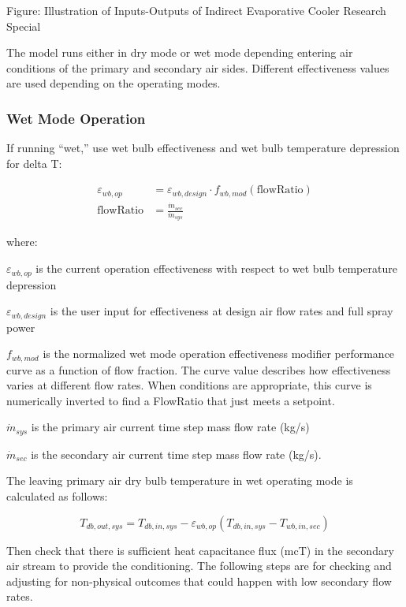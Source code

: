 Figure: Illustration of Inputs-Outputs of Indirect Evaporative Cooler Research Special

The model runs either in dry mode or wet mode depending entering air conditions of the primary and secondary air sides. Different effectiveness values are used depending on the operating modes.

\subsubsection{Wet Mode Operation}\label{wet-mode-operation}

If running ``wet,'' use wet bulb effectiveness and wet bulb temperature depression for delta T:

\begin{equation}
\begin{array}{rl}
  \varepsilon_{wb,op} & = \varepsilon_{wb,design}\cdot f_{wb,mod}\left(\text{flowRatio}\right) \\
  \text{flowRatio} & = \frac{\dot{m}_{sec}}{\dot{m}_{sys}}
\end{array}
\end{equation}

where:

\(\varepsilon_{wb,op}\) is the current operation effectiveness with respect to wet bulb temperature depression

\(\varepsilon_{wb,design}\) is the user input for effectiveness at design air flow rates and full spray power

\(f_{wb,mod}\) is the normalized wet mode operation effectiveness modifier performance curve as a function of flow fraction. The curve value describes how effectiveness varies at different flow rates. When conditions are appropriate, this curve is numerically inverted to find a FlowRatio that just meets a setpoint.

\(\dot{m}_{sys}\) is the primary air current time step mass flow rate (kg/s)

\(\dot{m}_{sec}\) is the secondary air current time step mass flow rate (kg/s).

The leaving primary air dry bulb temperature in wet operating mode is calculated as follows:

\begin{equation}
T_{db,out,sys} = T_{db,in,sys} - \varepsilon_{wb,op} \left( T_{db,in,sys} - T_{wb,in,sec} \right)
\end{equation}

Then check that there is sufficient heat capacitance flux (mcT) in the secondary air stream to provide the conditioning. The following steps are for checking and adjusting for non-physical outcomes that could happen with low secondary flow rates.

